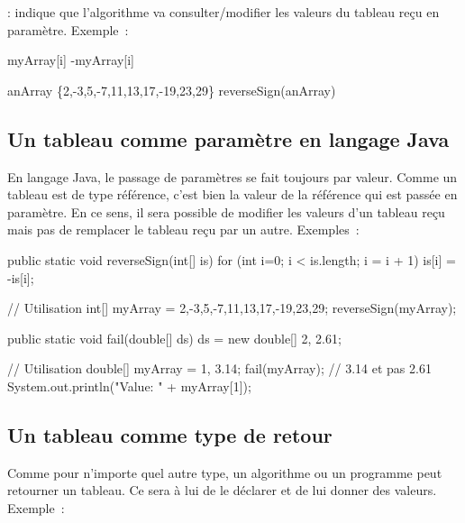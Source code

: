 		\In\Out : indique que l’algorithme va consulter/modifier les valeurs du
		tableau reçu en paramètre. Exemple~:
			
		\begin{pseudocode}
					\Let myArray[i] \Gets -myArray[i]
				\EndFor
			\EndAlgo 

			\Empty
			\Let anArray \Gets	
				{}
				\{2,-3,5,-7,11,13,17,-19,23,29\}
			\Stmt reverseSign(anArray)
		\end{pseudocode}


		\subsection{Un tableau comme paramètre en langage Java}

		En langage Java, le passage de paramètres se fait toujours par valeur.
		Comme un tableau est de type référence, c'est bien la valeur de la
		référence qui est passée en paramètre. En ce sens, il sera possible de
		modifier les valeurs d'un tableau reçu mais pas de remplacer le tableau
		reçu par un autre. Exemples~:

\begin{java}
	public static void reverseSign(int[] is){
		for (int i=0; i < is.length; i = i + 1){
			is[i] = -is[i];
		}
	}

	// Utilisation
	int[] myArray = {2,-3,5,-7,11,13,17,-19,23,29};
	reverseSign(myArray);
\end{java}

\begin{java}
	public static void fail(double[] ds){
		ds = new double[] {2, 2.61};
	}


	// Utilisation
	double[] myArray = {1, 3.14};
	fail(myArray);
	// 3.14 et pas 2.61
	System.out.println("Value: " + myArray[1]);		

\end{java}



		\subsection{Un tableau comme type de retour}

		Comme pour n’importe quel autre type, un algorithme ou un programme peut
		retourner un tableau.  Ce sera à lui de le déclarer et de lui donner des
		valeurs.  Exemple~:
			

